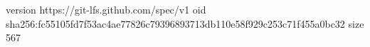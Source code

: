 version https://git-lfs.github.com/spec/v1
oid sha256:fc55105fd7f53ac4ae77826c79396893713db110e58f929c253c71f455a0bc32
size 567
